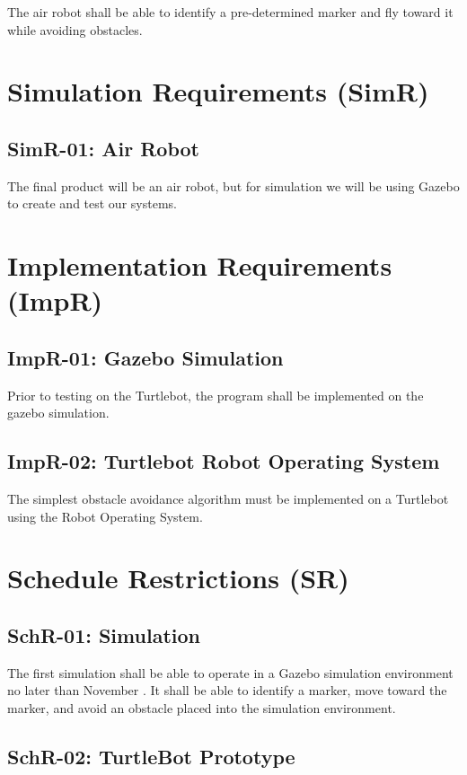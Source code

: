 \documentclass[]{report}
\begin{document}
The air robot shall be able to identify a pre-determined marker and fly toward it while avoiding obstacles.


\section{Simulation Requirements (SimR)}

\subsection{SimR-01: Air Robot}
The final product will be an air robot, but for simulation we will be using Gazebo to create and test our systems. 


\section{Implementation Requirements (ImpR)}

\subsection{ImpR-01: Gazebo Simulation}

Prior to testing on the Turtlebot, the program shall be implemented on the gazebo simulation.

\subsection{ImpR-02: Turtlebot Robot Operating System}

The simplest obstacle avoidance algorithm must be implemented on a Turtlebot using the Robot Operating System.


\section{Schedule Restrictions (SR)}

\subsection{SchR-01: Simulation}

The first simulation shall be able to operate in a Gazebo simulation environment no later than November . It shall be able to identify a marker, move toward the marker, and avoid an obstacle placed into the simulation environment.

\subsection{SchR-02: TurtleBot Prototype}
\end{document}
